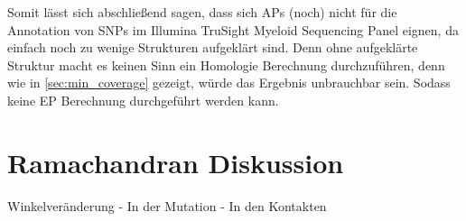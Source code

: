 Somit lässt sich abschließend sagen, dass sich \ac{APs} (noch) nicht für die Annotation von \ac{SNP}s im Illumina TruSight Myeloid Sequencing Panel eignen, da einfach noch zu wenige Strukturen aufgeklärt sind. Denn ohne aufgeklärte Struktur macht es keinen Sinn ein Homologie Berechnung durchzuführen, denn wie in \ref{sec:min_coverage} gezeigt, würde das Ergebnis unbrauchbar sein. Sodass keine \ac{EP} Berechnung durchgeführt werden kann. 


\section{Ramachandran Diskussion}

Winkelveränderung
- In der Mutation
- In den Kontakten